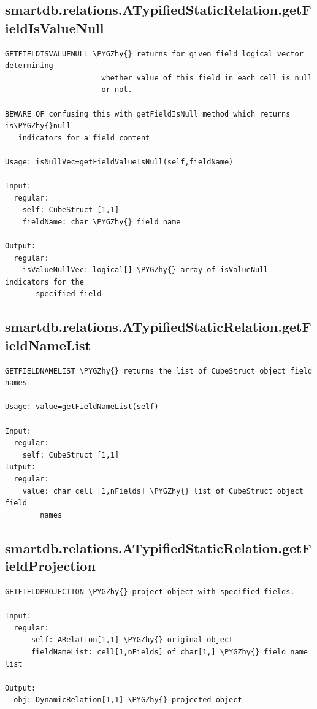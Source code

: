 \documentclass[letterpaper,10pt,english]{sphinxmanual}
\def\PYGZhy{\char`\-}
\begin{document}
\subsection{smartdb.relations.ATypifiedStaticRelation.getFieldIsValueNull}
\label{chap_functions:smartdb-relations-atypifiedstaticrelation-getfieldisvaluenull}
\begin{Verbatim}[commandchars=\\\{\}]
GETFIELDISVALUENULL \PYGZhy{} returns for given field logical vector determining
                      whether value of this field in each cell is null
                      or not.

BEWARE OF confusing this with getFieldIsNull method which returns is\PYGZhy{}null
   indicators for a field content

Usage: isNullVec=getFieldValueIsNull(self,fieldName)

Input:
  regular:
    self: CubeStruct [1,1]
    fieldName: char \PYGZhy{} field name

Output:
  regular:
    isValueNullVec: logical[] \PYGZhy{} array of isValueNull indicators for the
       specified field
\end{Verbatim}


\subsection{smartdb.relations.ATypifiedStaticRelation.getFieldNameList}
\label{chap_functions:smartdb-relations-atypifiedstaticrelation-getfieldnamelist}
\begin{Verbatim}[commandchars=\\\{\}]
GETFIELDNAMELIST \PYGZhy{} returns the list of CubeStruct object field names

Usage: value=getFieldNameList(self)

Input:
  regular:
    self: CubeStruct [1,1]
Iutput:
  regular:
    value: char cell [1,nFields] \PYGZhy{} list of CubeStruct object field
        names
\end{Verbatim}


\subsection{smartdb.relations.ATypifiedStaticRelation.getFieldProjection}
\label{chap_functions:smartdb-relations-atypifiedstaticrelation-getfieldprojection}
\begin{Verbatim}[commandchars=\\\{\}]
GETFIELDPROJECTION \PYGZhy{} project object with specified fields.

Input:
  regular:
      self: ARelation[1,1] \PYGZhy{} original object
      fieldNameList: cell[1,nFields] of char[1,] \PYGZhy{} field name list

Output:
  obj: DynamicRelation[1,1] \PYGZhy{} projected object
\end{Verbatim}
\end{document}
